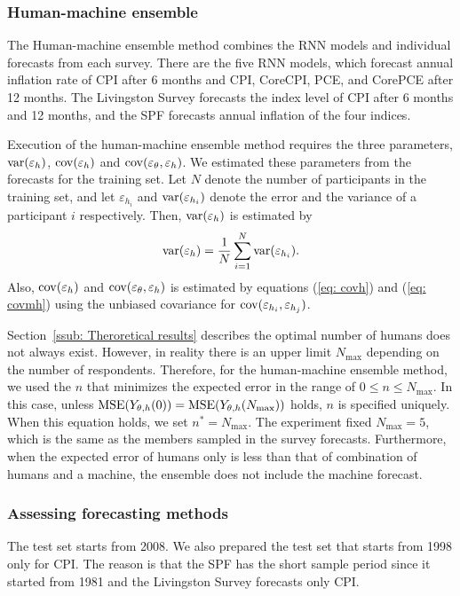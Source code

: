 \documentclass[../main.tex]{subfiles}
\begin{document}
\subsubsection{Human-machine ensemble}

The Human-machine ensemble method combines the RNN models and individual forecasts from each survey.
There are the five RNN models, which forecast annual inflation rate of CPI after 6 months and CPI, CoreCPI, PCE, and CorePCE after 12 months.
The Livingston Survey forecasts the index level of CPI after 6 months and 12 months, and the SPF forecasts annual inflation of the four indices.

Execution of the human-machine ensemble method requires the three parameters, $\operatorname{var}(\varepsilon_h)$, $\operatorname{cov}(\varepsilon_h)$ and $\operatorname{cov}(\varepsilon_\theta, \varepsilon_h)$.
We estimated these parameters from the forecasts for the training set.
Let $N$ denote the number of participants in the training set, and let $\varepsilon_{h_i}$ and $\operatorname{var}(\varepsilon_{h_i})$ denote the error and the variance of a participant $i$ respectively.
Then, $\operatorname{var}(\varepsilon_h)$ is estimated by
\begin{equation}
  \operatorname{var}(\varepsilon_h) = \frac{1}{N}\sum_{i=1}^N\operatorname{var}(\varepsilon_{h_i}).
\end{equation}
Also, $\operatorname{cov}(\varepsilon_h)$ and $\operatorname{cov}(\varepsilon_\theta, \varepsilon_h)$ is estimated by equations (\ref{eq: covh}) and (\ref{eq: covmh}) using the unbiased covariance for $\operatorname{cov}(\varepsilon_{h_i}, \varepsilon_{h_j})$.

Section~\ref{ssub: Theroretical results} describes the optimal number of humans does not always exist.
However, in reality there is an upper limit $N_{\max}$ depending on the number of respondents.
Therefore, for the human-machine ensemble method, we used the $n$ that minimizes the expected error in the range of $0 \leq n \leq N_{\max}$.
In this case, unless $\operatorname{MSE}(Y_{\theta, h}(0)) = \operatorname{MSE}(Y_{\theta, h}(N_{\max}))$ holds, $n$ is specified uniquely.
When this equation holds, we set $n^\ast = N_{\max}$.
The experiment fixed $N_{\max} = 5$, which is the same as the members sampled in the survey forecasts.
Furthermore, when the expected error of humans only is less than that of combination of humans and a machine, the ensemble does not include the machine forecast.

\subsubsection{Assessing forecasting methods}
\label{ssub: Assessing forecasting methods}

The test set starts from 2008.
We also prepared the test set that starts from 1998 only for CPI\@.
The reason is that the SPF has the short sample period since it started from 1981 and the Livingston Survey forecasts only CPI\@.
\end{document}
